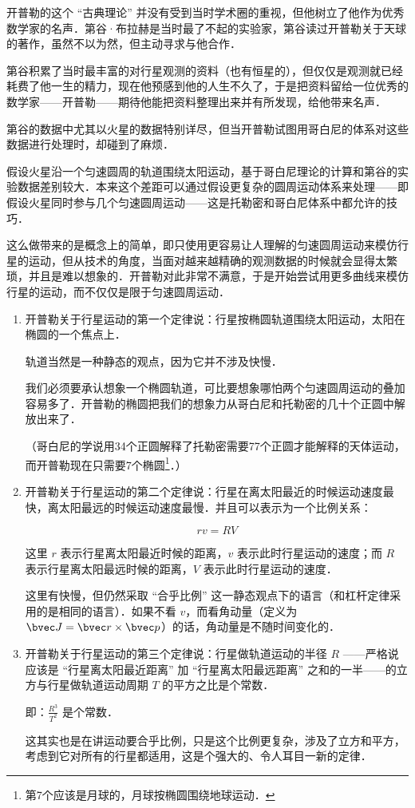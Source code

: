 开普勒的这个 “古典理论” 并没有受到当时学术圈的重视，但他树立了他作为优秀数学家的名声．第谷·布拉赫是当时最了不起的实验家，第谷读过开普勒关于天球的著作，虽然不以为然，但主动寻求与他合作．

第谷积累了当时最丰富的对行星观测的资料（也有恒星的），但仅仅是观测就已经耗费了他一生的精力，现在他预感到他的人生不久了，于是把资料留给一位优秀的数学家——开普勒——期待他能把资料整理出来并有所发现，给他带来名声．

第谷的数据中尤其以火星的数据特别详尽，但当开普勒试图用哥白尼的体系对这些数据进行处理时，却碰到了麻烦．

假设火星沿一个匀速圆周的轨道围绕太阳运动，基于哥白尼理论的计算和第谷的实验数据差别较大．本来这个差距可以通过假设更复杂的圆周运动体系来处理——即假设火星同时参与几个匀速圆周运动——这是托勒密和哥白尼体系中都允许的技巧．

这么做带来的是概念上的简单，即只使用更容易让人理解的匀速圆周运动来模仿行星的运动，但从技术的角度，当面对越来越精确的观测数据的时候就会显得太繁琐，并且是难以想象的．开普勒对此非常不满意，于是开始尝试用更多曲线来模仿行星的运动，而不仅仅是限于匀速圆周运动．

\begin{enumerate}
\item 

开普勒关于行星运动的第一个定律说：行星按椭圆轨道围绕太阳运动，太阳在椭圆的一个焦点上．

轨道当然是一种静态的观点，因为它并不涉及快慢．

我们必须要承认想象一个椭圆轨道，可比要想象哪怕两个匀速圆周运动的叠加容易多了．开普勒的椭圆把我们的想象力从哥白尼和托勒密的几十个正圆中解放出来了．

（哥白尼的学说用34个正圆解释了托勒密需要77个正圆才能解释的天体运动，而开普勒现在只需要7个椭圆\footnote{第7个应该是月球的，月球按椭圆围绕地球运动．}．）

\item

开普勒关于行星运动的第二个定律说：行星在离太阳最近的时候运动速度最快，离太阳最远的时候运动速度最慢．并且可以表示为一个比例关系：

\begin{equation}
r v = R V
\end{equation}

这里 $r$ 表示行星离太阳最近时候的距离，$v$ 表示此时行星运动的速度；而 $R$ 表示行星离太阳最远时候的距离，$V$ 表示此时行星运动的速度．

这里有快慢，但仍然采取 “合乎比例” 这一静态观点下的语言（和杠杆定律采用的是相同的语言）．如果不看 $v$，而看角动量（定义为 $\bvec J = \bvec r \times \bvec p$）的话，角动量是不随时间变化的．

\item

开普勒关于行星运动的第三个定律说：行星做轨道运动的半径 $R$ ——严格说应该是 “行星离太阳最近距离” 加 “行星离太阳最远距离” 之和的一半——的立方与行星做轨道运动周期 $T$ 的平方之比是个常数．

即：$\frac{R^3}{T^2} $ 是个常数．

这其实也是在讲运动要合乎比例，只是这个比例更复杂，涉及了立方和平方，考虑到它对所有的行星都适用，这是个强大的、令人耳目一新的定律．

\end{enumerate}


